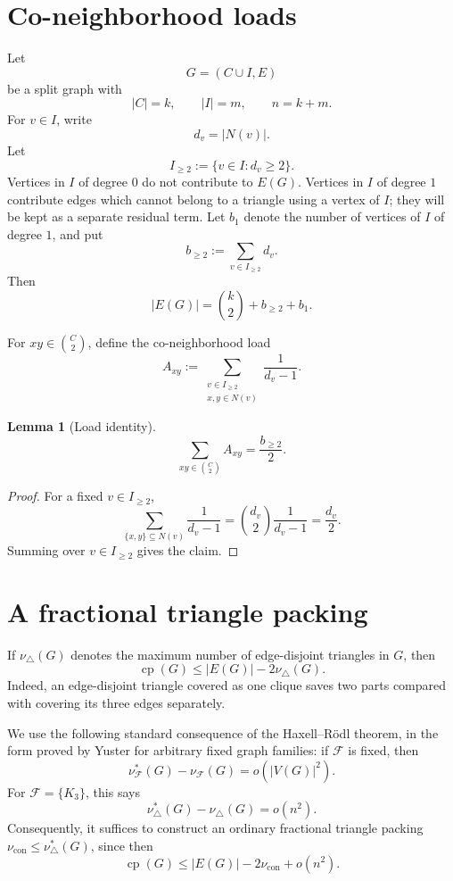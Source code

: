 \documentclass[11pt]{article}
\newtheorem{lemma}{Lemma}
\newcommand{\cp}{\operatorname{cp}}
\begin{document}
\section{Co-neighborhood loads}

Let
\[
    G=(C\cup I,E)
\]
be a split graph with
\[
    |C|=k,\qquad |I|=m,\qquad n=k+m.
\]
For \(v\in I\), write
\[
    d_v=|N(v)|.
\]
Let
\[
    I_{\ge2}:=\{v\in I:d_v\ge2\}.
\]
Vertices in \(I\) of degree \(0\) do not contribute to \(E(G)\). Vertices in \(I\) of degree \(1\) contribute edges which cannot belong to a triangle using a vertex of \(I\); they will be kept as a separate residual term. Let \(b_1\) denote the number of vertices of \(I\) of degree \(1\), and put
\[
    b_{\ge2}:=\sum_{v\in I_{\ge2}} d_v .
\]
Then
\[
    |E(G)|=\binom{k}{2}+b_{\ge2}+b_1.
\]

For \(xy\in \binom C2\), define the co-neighborhood load
\[
    A_{xy}:=
    \sum_{\substack{v\in I_{\ge2}\\ x,y\in N(v)}}
    \frac{1}{d_v-1}.
\]

\begin{lemma}[Load identity]
\[
    \sum_{xy\in \binom C2}A_{xy}=\frac{b_{\ge2}}2.
\]
\end{lemma}

\begin{proof}
For a fixed \(v\in I_{\ge2}\),
\[
    \sum_{\{x,y\}\subseteq N(v)}\frac1{d_v-1}
    =
    \binom{d_v}{2}\frac1{d_v-1}
    =
    \frac{d_v}{2}.
\]
Summing over \(v\in I_{\ge2}\) gives the claim.
\end{proof}

\section{A fractional triangle packing}

If \(\nu_\triangle(G)\) denotes the maximum number of edge-disjoint triangles in \(G\), then
\[
    \cp(G)\le |E(G)|-2\nu_\triangle(G).
\]
Indeed, an edge-disjoint triangle covered as one clique saves two parts compared with covering its three edges separately.

We use the following standard consequence of the Haxell--Rödl theorem, in the form proved by Yuster for arbitrary fixed graph families: if \(\mathcal F\) is fixed, then
\[
    \nu^*_{\mathcal F}(G)-\nu_{\mathcal F}(G)=o(|V(G)|^2).
\]
For \(\mathcal F=\{K_3\}\), this says
\[
    \nu_\triangle^*(G)-\nu_\triangle(G)=o(n^2).
\]
Consequently, it suffices to construct an ordinary fractional triangle packing \(\nu_{\mathrm{con}}\le\nu_\triangle^*(G)\), since then
\[
    \cp(G)\le |E(G)|-2\nu_{\mathrm{con}}+o(n^2).
\]
\end{document}
